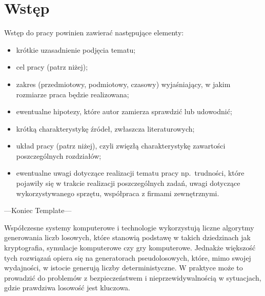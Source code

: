 
\chapter{Wstęp}

Wstęp do pracy powinien zawierać następujące elementy:
\begin{itemize}
    \item krótkie uzasadnienie podjęcia tematu;
    \item cel pracy (patrz niżej);
    \item zakres (przedmiotowy, podmiotowy, czasowy) wyjaśniający, w jakim rozmiarze praca będzie realizowana;
    \item ewentualne hipotezy, które autor zamierza sprawdzić lub udowodnić;
    \item krótką charakterystykę źródeł, zwłaszcza literaturowych;
    \item układ pracy (patrz niżej), czyli zwięzłą charakterystykę zawartości poszczególnych rozdziałów;
    \item ewentualne uwagi dotyczące realizacji tematu pracy np.~trudności, które pojawiły się w trakcie
    realizacji poszczególnych zadań, uwagi dotyczące wykorzystywanego sprzętu, współpraca z firmami zewnętrznymi.
\end{itemize}

%
%

---Koniec Template---

Współczesne systemy komputerowe i technologie wykorzystują liczne algorytmy generowania liczb losowych, które stanowią podstawę w takich dziedzinach jak kryptografia,
symulacje komputerowe czy gry komputerowe.
Jednakże większość tych rozwiązań opiera się na generatorach pseudolosowych,
które, mimo swojej wydajności, w istocie generują liczby deterministyczne.
W praktyce może to prowadzić do problemów z bezpieczeństwem i nieprzewidywalnością w sytuacjach, gdzie prawdziwa losowość jest kluczowa.

